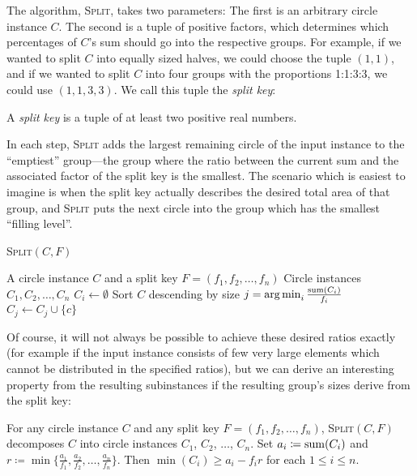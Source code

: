 \documentclass[%
    a4paper,              %
    style=screen,          %
    bibliography=totoc,   %
    nexus,                %
    lnum,                 %
    extramargin,          %
]{tubsbook}
\begin{document}
The algorithm, \textsc{Split}, takes two parameters: The first is an arbitrary circle instance $C$. The second is a tuple of positive factors, which determines which percentages of $C$'s sum should go into the respective groups. For example, if we wanted to split $C$ into equally sized halves, we could choose the tuple $(1,1)$, and if we wanted to split $C$ into four groups with the proportions 1:1:3:3, we could use $(1,1,3,3)$. We call this tuple the \emph{split key}:

\begin{definition}
    A \emph{split key} is a tuple of at least two positive real numbers.
\end{definition}

In each step, \textsc{Split} adds the largest remaining circle of the input instance to the “emptiest” group---the group where the ratio between the current sum and the associated factor of the split key is the smallest. The scenario which is easiest to imagine is when the split key actually describes the desired total area of that group, and \textsc{Split} puts the next circle into the group which has the smallest “filling level”.

\begin{algorithm}[htbp!]
    \caption{\textsc{Split}$(C,F)$}
    \begin{algorithmic}
        \Require A circle instance $C$ and a split key $F = (f_1, f_2, \dots, f_n)$
        \Ensure Circle instances $C_1, C_2, \dots, C_n$
            \State $C_i \gets \emptyset$
        \EndFor
        \State Sort $C$ descending by size
            \State $j = \operatorname*{arg\,min}_{i} \frac{\operatorname{sum}(C_i)}{f_i}$
            \State $C_j \gets C_j \cup \{c\}$
        \EndFor
    \end{algorithmic}
\end{algorithm}

Of course, it will not always be possible to achieve these desired ratios exactly (for example if the input instance consists of few very large elements which cannot be distributed in the specified ratios), but we can derive an interesting property from the resulting subinstances if the resulting group's sizes derive from the split key:

\begin{lemma}\label{th:split-property}
    For any circle instance $C$ and any split key $F = (f_1, f_2, \dots, f_n)$, \textsc{Split}$(C,F)$ decomposes $C$ into circle instances $C_1$, $C_2$, $\dots$, $C_n$.
    Set $a_i \coloneqq \operatorname{sum}(C_i)$ and $r \coloneqq \min\{\frac{a_1}{f_1}, \frac{a_2}{f_2}, \dots, \frac{a_n}{f_n}\}$.
    Then $\min(C_i) \ge a_i - f_i r$ for each $1 \le i \le n$.
\end{lemma}
\end{document}
